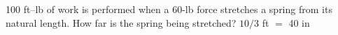 {100 ft--lb of work is performed when a 60-lb force stretches a spring from its natural length.  How far is the spring being stretched?}
{$10/3$ ft $=$ 40 in}
